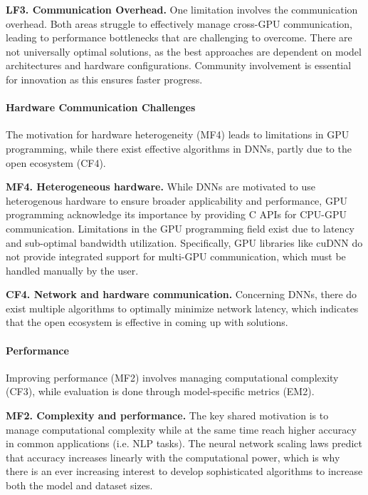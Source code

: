 \textbf{LF3. Communication Overhead.}
One limitation involves the communication overhead. Both areas struggle
to effectively manage cross-GPU communication, leading to performance bottlenecks that are challenging to overcome. There are not universally
optimal solutions, as the best approaches are dependent on model architectures and hardware configurations.
Community involvement is essential for innovation as this ensures faster progress.

\paragraph{Hardware Communication Challenges}
The motivation for hardware heterogeneity (MF4) leads to limitations in GPU programming, while
there exist effective algorithms in DNNs, partly due to the open ecosystem (CF4).

\textbf{MF4. Heterogeneous hardware.}
While DNNs are motivated to use heterogenous hardware to ensure broader applicability and
performance, GPU programming acknowledge its importance by providing C APIs for CPU-GPU
communication. Limitations in the GPU programming field exist due to latency and sub-optimal bandwidth
utilization. Specifically, GPU libraries like cuDNN do not provide integrated support for multi-GPU communication, which must be handled manually by the user.

\textbf{CF4. Network and hardware communication.}
Concerning DNNs, there do exist multiple algorithms to optimally minimize network latency, which
indicates that the open ecosystem is effective in coming up with solutions.

\paragraph{Performance}
Improving performance (MF2) involves managing computational complexity (CF3), while evaluation is
done through model-specific metrics (EM2).

\textbf{MF2. Complexity and performance.}
The key shared motivation is to manage computational complexity while at the same time reach higher accuracy
in common applications (i.e. NLP tasks). The neural network scaling laws predict that accuracy increases
linearly with the computational power, which is why there is an ever increasing interest to develop
sophisticated algorithms to increase both the model and dataset sizes.

